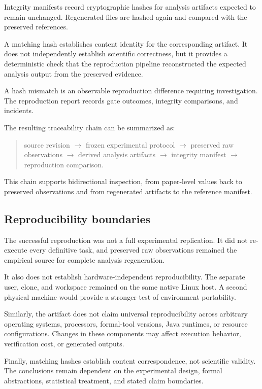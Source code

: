Integrity manifests record cryptographic hashes for analysis artifacts
expected to remain unchanged. Regenerated files are hashed again and compared
with the preserved references.

A matching hash establishes content identity for the corresponding
artifact. It does not independently establish scientific correctness,
but it provides a deterministic check that the reproduction pipeline
reconstructed the expected analysis output from the preserved evidence.

A hash mismatch is an observable reproduction difference requiring
investigation. The reproduction report records gate outcomes, integrity
comparisons, and incidents.

The resulting traceability chain can be summarized as:

\begin{quote}
source revision $\rightarrow$
frozen experimental protocol $\rightarrow$
preserved raw observations $\rightarrow$
derived analysis artifacts $\rightarrow$
integrity manifest $\rightarrow$
reproduction comparison.
\end{quote}

This chain supports bidirectional inspection, from paper-level values back to
preserved observations and from regenerated artifacts to the reference
manifest.

\subsection{Reproducibility boundaries}
\label{subsec:reproducibility-boundaries}

The successful reproduction was not a full experimental replication. It did
not re-execute every definitive task, and preserved raw observations remained
the empirical source for complete analysis regeneration.

It also does not establish hardware-independent reproducibility. The separate
user, clone, and workspace remained on the same native Linux host. A second
physical machine would provide a stronger test of environment portability.

Similarly, the artifact does not claim universal reproducibility across
arbitrary operating systems, processors, formal-tool versions, Java
runtimes, or resource configurations. Changes in these components may
affect execution behavior, verification cost, or generated outputs.

Finally, matching hashes establish content correspondence, not scientific
validity. The conclusions remain dependent on the experimental design,
formal abstractions, statistical treatment, and stated claim boundaries.

